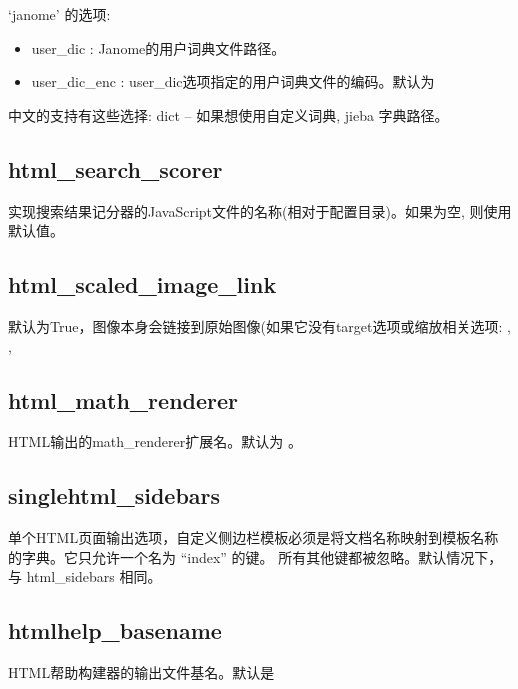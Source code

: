 \documentclass[a4paper,10pt,english]{sphinxmanual}
\begin{document}
\sphinxAtStartPar
‘janome’ 的选项:
\begin{itemize}
\item {} 
\sphinxAtStartPar
user\_dic : Janome的用户词典文件路径。

\item {} 
\sphinxAtStartPar
user\_dic\_enc : user\_dic选项指定的用户词典文件的编码。默认为 

\end{itemize}

\sphinxAtStartPar
中文的支持有这些选择:
dict – 如果想使用自定义词典, jieba 字典路径。


\subsection{html\_search\_scorer}
\label{\detokenize{sphinx_conf:html-search-scorer}}
\sphinxAtStartPar
实现搜索结果记分器的JavaScript文件的名称(相对于配置目录)。如果为空, 则使用默认值。


\subsection{html\_scaled\_image\_link}
\label{\detokenize{sphinx_conf:html-scaled-image-link}}
\sphinxAtStartPar
默认为True，图像本身会链接到原始图像(如果它没有target选项或缩放相关选项:  ,  , 


\subsection{html\_math\_renderer}
\label{\detokenize{sphinx_conf:html-math-renderer}}
\sphinxAtStartPar
HTML输出的math\_renderer扩展名。默认为  。


\subsection{singlehtml\_sidebars}
\label{\detokenize{sphinx_conf:singlehtml-sidebars}}
\sphinxAtStartPar
单个HTML页面输出选项，自定义侧边栏模板必须是将文档名称映射到模板名称的字典。它只允许一个名为 “index” 的键。
所有其他键都被忽略。默认情况下，与 html\_sidebars 相同。


\subsection{htmlhelp\_basename}
\label{\detokenize{sphinx_conf:htmlhelp-basename}}
\sphinxAtStartPar
HTML帮助构建器的输出文件基名。默认是 
\end{document}
